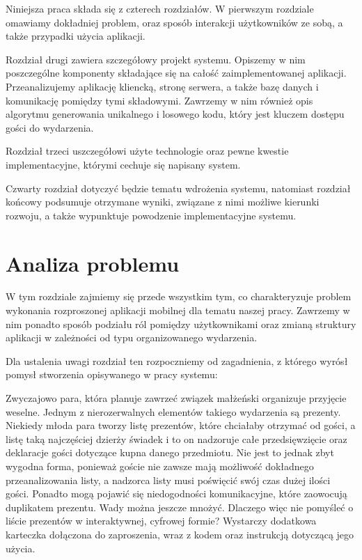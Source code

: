 \documentclass[10pt,titlepage]{article}
\begin{document}
Niniejsza praca składa się z czterech rozdziałów. W pierwszym rozdziale omawiamy dokładniej problem, oraz sposób interakcji użytkowników ze sobą, a także
przypadki użycia aplikacji.

Rozdział drugi zawiera szczegółowy projekt systemu. Opiszemy w nim poszczególne komponenty składające się na całość zaimplementowanej aplikacji. Przeanalizujemy
aplikację kliencką, stronę serwera, a także bazę danych i komunikację pomiędzy tymi składowymi. Zawrzemy w nim również opis algorytmu generowania unikalnego i losowego
kodu, który jest kluczem dostępu gości do wydarzenia.

Rozdział trzeci uszczegółowi użyte technologie oraz pewne kwestie implementacyjne, którymi cechuje się napisany system.

Czwarty rozdział dotyczyć będzie tematu wdrożenia systemu, natomiast rozdział końcowy podsumuje otrzymane wyniki, związane z nimi możliwe kierunki rozwoju,
a także wypunktuje powodzenie implementacyjne systemu.

\newpage
\section{Analiza problemu}
W tym rozdziale zajmiemy się przede wszystkim tym, co charakteryzuje problem wykonania rozproszonej aplikacji mobilnej dla tematu naszej pracy. Zawrzemy w nim
ponadto sposób podziału ról pomiędzy użytkownikami oraz zmianą struktury aplikacji w zależności od typu organizowanego wydarzenia.

Dla ustalenia uwagi rozdział ten rozpoczniemy od zagadnienia, z którego wyrósł pomysł stworzenia opisywanego w pracy systemu:

\begin{beamerlikethm}{}
Zwyczajowo para, która planuje zawrzeć związek małżeński organizuje przyjęcie weselne. Jednym z nierozerwalnych elementów takiego wydarzenia są prezenty.
Niekiedy młoda para tworzy listę prezentów, które chciałaby otrzymać od gości, a listę taką najczęściej dzierży świadek i to on nadzoruje całe przedsięwzięcie
oraz deklaracje gości dotyczące kupna danego przedmiotu. Nie jest to jednak zbyt wygodna forma, ponieważ goście nie zawsze mają możliwość dokładnego przeanalizowania
listy, a nadzorca listy musi poświęcić swój czas dużej ilości gości. Ponadto mogą pojawić się niedogodności komunikacyjne, które zaowocują duplikatem prezentu. Wady można
jeszcze mnożyć. Dlaczego więc nie pomyśleć o liście prezentów w interaktywnej, cyfrowej formie? Wystarczy dodatkowa karteczka dołączona do zaproszenia, wraz z kodem
oraz instrukcją dotyczącą jego użycia.
\end{beamerlikethm}
\end{document}

